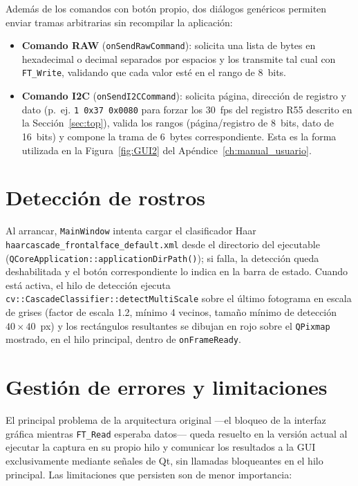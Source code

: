 \documentclass[../main.tex]{subfiles}
\begin{document}
Además de los comandos con botón propio, dos diálogos genéricos permiten enviar tramas arbitrarias sin recompilar la aplicación:
\begin{itemize}
    \item \textbf{Comando RAW} (\texttt{onSendRawCommand}): solicita una lista de bytes en hexadecimal o decimal separados por espacios y los transmite tal cual con \texttt{FT\_Write}, validando que cada valor esté en el rango de 8~bits.
    \item \textbf{Comando I2C} (\texttt{onSendI2CCommand}): solicita página, dirección de registro y dato (p.~ej. \texttt{1 0x37 0x0080} para forzar los 30~fps del registro R55 descrito en la Sección~\ref{sec:top}), valida los rangos (página/registro de 8~bits, dato de 16~bits) y compone la trama de 6~bytes correspondiente. Esta es la forma utilizada en la Figura~\ref{fig:GUI2} del Apéndice~\ref{ch:manual_usuario}.
\end{itemize}

\section{Detección de rostros}
\label{sec:deteccion_rostros}

Al arrancar, \texttt{MainWindow} intenta cargar el clasificador Haar \texttt{haarcascade\_frontalface\_default.xml} desde el directorio del ejecutable (\texttt{QCoreApplication::applicationDirPath()}); si falla, la detección queda deshabilitada y el botón correspondiente lo indica en la barra de estado. Cuando está activa, el hilo de detección ejecuta \texttt{cv::CascadeClassifier::detectMultiScale} sobre el último fotograma en escala de grises (factor de escala 1.2, mínimo 4 vecinos, tamaño mínimo de detección $40\times40$~px) y los rectángulos resultantes se dibujan en rojo sobre el \texttt{QPixmap} mostrado, en el hilo principal, dentro de \texttt{onFrameReady}.

\section{Gestión de errores y limitaciones}
\label{sec:limitaciones_sw}

El principal problema de la arquitectura original —el bloqueo de la interfaz gráfica mientras \texttt{FT\_Read} esperaba datos— queda resuelto en la versión actual al ejecutar la captura en su propio hilo y comunicar los resultados a la \ac{GUI} exclusivamente mediante señales de Qt, sin llamadas bloqueantes en el hilo principal. Las limitaciones que persisten son de menor importancia:
\end{document}
